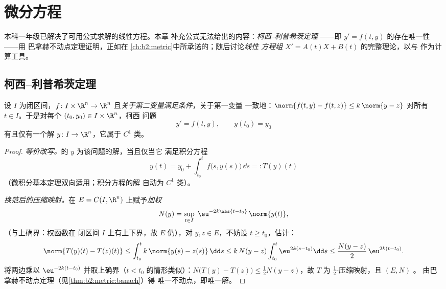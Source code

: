 \chapter{微分方程}\label{ch:b2:diffeq}

本科一年级已解决了可用公式求解的线性方程。本章
补充公式无法给出的内容：\emph{柯西--利普希茨定理}
——即 $y' = f(t, y)$ 的存在唯一性——用
巴拿赫不动点定理证明，正如在
\cref{ch:b2:metric}中所承诺的；随后讨论\emph{线性
方程组} $X' = A(t)X + B(t)$ 的完整理论，以与
作为计算工具。

\section{柯西--利普希茨定理}

\begin{theorem}\label{thm:b2:diffeq:cauchylipschitz}
设 $I$ 为闭区间，$f \colon I \times \R^n \to \R^n$ 
且\emph{关于第二变量满足条件}，关于第一变量
一致地：$\norm{f(t, y) - f(t, z)} \leq k\,\norm{y - z}$ 对所有 $t
\in I$。于是对每个 $(t_0, y_0) \in I \times \R^n$，柯西
问题
\[
y' = f(t, y), \qquad y(t_0) = y_0
\]
有且仅有一个解 $y \colon I \to \R^n$，它属于 $C^1$ 类。
\end{theorem}

\begin{proof}
\emph{等价改写。}的 $y$ 为该问题的解，当且仅当它
满足积分方程
\[
y(t) = y_0 + \int_{t_0}^{t} f\bigl(s, y(s)\bigr)\,\dd s
=: T(y)(t)
\]
（微积分基本定理双向适用；积分方程的解
自动为 $C^1$ 类）。

\emph{换范后的压缩映射。}在 $E =
C(I, \R^n)$ 上赋予\emph{加权}
\[
N(y) = \sup_{t \in I}\; \eu^{-2k\abs{t - t_0}}\,\norm{y(t)} ,
\]
（与上确界：权函数在
闭区间 $I$ 上有上下界，故 $E$ 仍），对 $y, z \in
E$，不妨设 $t \geq t_0$，估计：
\[
\norm{T(y)(t) - T(z)(t)}
\leq \int_{t_0}^{t} k\,\norm{y(s) - z(s)}\,\dd s
\leq k\,N(y - z)\int_{t_0}^{t} \eu^{2k(s - t_0)}\dd s
\leq \frac{N(y-z)}{2}\,\eu^{2k(t - t_0)} .
\]
将两边乘以 $\eu^{-2k(t - t_0)}$ 并取上确界（$t
< t_0$ 的情形类似）：$N\bigl(T(y) - T(z)\bigr) \leq \frac12 N(y -
z)$，故 $T$ 为 $\frac12$-压缩映射，且 $(E, N)$ 。
由巴拿赫不动点定理（见\cref{thm:b2:metric:banach}）得
唯一不动点，即唯一解。
\end{proof}

